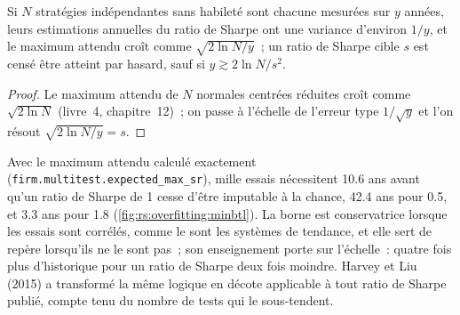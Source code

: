 \begin{proposition}\label{prop:rs:overfitting:minbtl}
Si $N$ stratégies indépendantes sans habileté sont chacune mesurées sur $y$ années, leurs estimations annuelles du ratio de Sharpe ont une variance d'environ $1/y$, et le
maximum attendu croît comme $\sqrt{2\ln N/y}$~; un ratio de Sharpe cible $s$ est censé être atteint par hasard, sauf si $y \gtrsim 2\ln N/s^2$.
\end{proposition}

\begin{proof}
Le maximum attendu de $N$ normales centrées réduites croît comme $\sqrt{2\ln N}$ (livre~4, chapitre~12)~; on passe à l'échelle de l'erreur type $1/\sqrt y$ et l'on résout
$\sqrt{2\ln N/y} = s$.
\end{proof}

Avec le maximum attendu calculé exactement (\texttt{firm.multitest.expected\_max\_sr}), mille essais nécessitent 10.6 ans avant qu'un ratio de Sharpe de 1 cesse
d'être imputable à la chance, 42.4 ans pour 0.5, et 3.3 ans pour 1.8 (\cref{fig:rs:overfitting:minbtl}). La borne est conservatrice lorsque les essais sont
corrélés, comme le sont les systèmes de tendance, et elle sert de repère lorsqu'ils ne le sont pas~; son enseignement porte sur l'échelle~: quatre fois plus d'historique pour un ratio de Sharpe deux fois moindre. Harvey et
Liu (2015) a transformé la même logique en décote applicable à tout ratio de Sharpe publié, compte tenu du nombre de tests qui le sous-tendent.

\begin{omfigure}

\label{fig:rs:overfitting:minbtl}
\end{omfigure}

